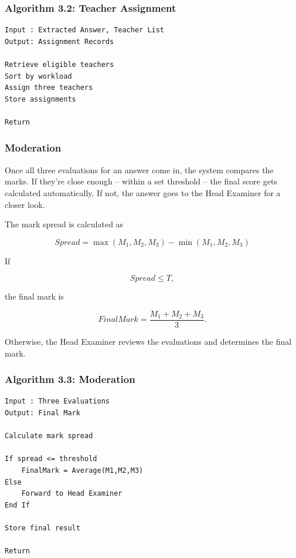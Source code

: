 \subsubsection*{Algorithm 3.2: Teacher Assignment}

\begin{verbatim}
Input : Extracted Answer, Teacher List
Output: Assignment Records

Retrieve eligible teachers
Sort by workload
Assign three teachers
Store assignments

Return
\end{verbatim}

\subsubsection{Moderation}

Once all three evaluations for an answer come in, the system compares the marks. If they're close enough -- within a set threshold -- the final score gets calculated automatically. If not, the answer goes to the Head Examiner for a closer look.

The mark spread is calculated as

\begin{equation}
Spread=\max(M_1,M_2,M_3)-\min(M_1,M_2,M_3)
\end{equation}

If

\begin{equation}
Spread \leq T,
\end{equation}

the final mark is

\begin{equation}
FinalMark=\frac{M_1+M_2+M_3}{3}.
\end{equation}

Otherwise, the Head Examiner reviews the evaluations and determines the final mark.

\subsubsection*{Algorithm 3.3: Moderation}

\begin{verbatim}
Input : Three Evaluations
Output: Final Mark

Calculate mark spread

If spread <= threshold
    FinalMark = Average(M1,M2,M3)
Else
    Forward to Head Examiner
End If

Store final result

Return
\end{verbatim}

